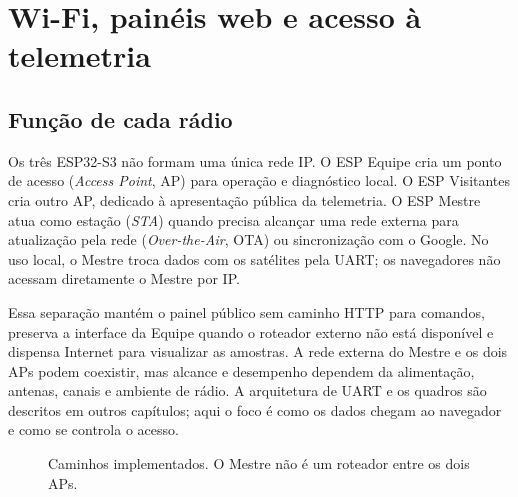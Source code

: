 \chapter{Wi-Fi, painéis web e acesso à telemetria}\label{cap:wifi-paineis}

\section{Função de cada rádio}
Os três ESP32-S3 não formam uma única rede IP. O ESP Equipe cria um ponto de acesso (\emph{Access Point}, AP) para operação e diagnóstico local. O ESP Visitantes cria outro AP, dedicado à apresentação pública da telemetria. O ESP Mestre atua como estação (\emph{STA}) quando precisa alcançar uma rede externa para atualização pela rede (\emph{Over-the-Air}, OTA) ou sincronização com o Google. No uso local, o Mestre troca dados com os satélites pela UART; os navegadores não acessam diretamente o Mestre por IP.

Essa separação mantém o painel público sem caminho HTTP para comandos, preserva a interface da Equipe quando o roteador externo não está disponível e dispensa Internet para visualizar as amostras. A rede externa do Mestre e os dois APs podem coexistir, mas alcance e desempenho dependem da alimentação, antenas, canais e ambiente de rádio. A arquitetura de UART e os quadros são descritos em outros capítulos; aqui o foco é como os dados chegam ao navegador e como se controla o acesso.

\begin{figure}[htbp]\centering
{}
\caption{Caminhos implementados. O Mestre não é um roteador entre os dois APs.}\label{fig:fluxo-web}
\end{figure}

